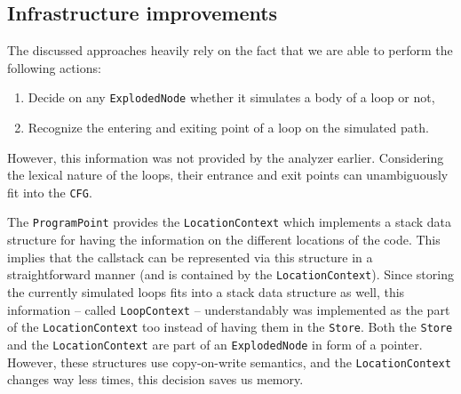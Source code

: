 \subsection{Infrastructure improvements}\label{sec:inf}
The discussed approaches heavily rely on the fact that we are able to 
perform the following actions:
\begin{enumerate}
	\item Decide on any \texttt{ExplodedNode} whether it simulates a body of a 
	loop or not,
	\item Recognize the entering and exiting point of a loop on the simulated 
	path.
\end{enumerate}

However, this information was not provided by the analyzer earlier. Considering the 
lexical nature of the loops, their entrance and exit points can unambiguously 
fit into the \texttt{CFG}. 

The \texttt{ProgramPoint} provides the \texttt{LocationContext} which implements a stack data structure for having the information on the different locations of the code.  This implies that the callstack can be represented via this structure in a straightforward manner (and is contained by the \texttt{LocationContext}).
Since storing the currently simulated loops fits into a stack data structure as well, this information -- called \texttt{LoopContext} -- understandably was implemented as the part of the \texttt{LocationContext} too instead of having them in the \texttt{Store}. Both the \texttt{Store} and the \texttt{LocationContext} are part of an \texttt{ExplodedNode} in form of a pointer. However, these structures use copy-on-write semantics, and the \texttt{LocationContext} changes way less times, this decision saves us memory. 